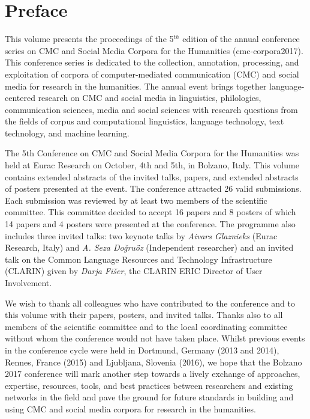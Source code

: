 \documentclass[usegeometry]{scrbook}
\begin{document}
\vfill

\noindent\colophon

\smallskip

\doclicenseThis
\thispagestyle{empty}
\clearpage


\chapter*{Preface}
{}
This volume presents the proceedings of the 5{$^{th}$} edition of the annual conference series on CMC and Social Media Corpora for the Humanities (cmc-corpora2017). This conference series is dedicated to the collection, annotation, processing, and exploitation of corpora of computer-mediated communication (CMC) and social media for research in the humanities. The annual event brings together language-centered research on CMC and social media in linguistics, philologies, communication sciences, media and social sciences with research questions from the fields of corpus and computational linguistics, language technology, text technology, and machine learning.

The 5th Conference on CMC and Social Media Corpora for the Humanities was held at Eurac Research on October, 4th and 5th, in Bolzano, Italy. This volume contains extended abstracts of the invited talks, papers, and extended abstracts of posters presented at the event. The conference attracted 26 valid submissions. Each submission was reviewed by at least two members of the scientific committee. This committee decided to accept 16 papers and 8 posters of which 14 papers and 4 posters were presented at the conference. The programme also includes three invited talks: two keynote talks by \textit{Aivars Glaznieks} (Eurac Research, Italy) and \textit{A. Seza Do\u{g}ru\"oz} (Independent researcher) and an invited talk on the Common Language Resources and Technology Infrastructure (CLARIN) given by \textit{Darja Fi\v{s}er}, the CLARIN ERIC Director of User Involvement.

We wish to thank all colleagues who have contributed to the conference and to this volume with their papers, posters, and invited talks. Thanks also to all members of the scientific committee and to the local coordinating committee without whom the conference would not have taken place. Whilst previous events in the conference cycle were held in Dortmund, Germany (2013 and 2014), Rennes, France (2015) and Ljubljana, Slovenia (2016), we hope that the Bolzano 2017 conference will mark another step towards a lively exchange of approaches, expertise, resources, tools, and best practices between researchers and existing networks in the field and pave the ground for future standards in building and using CMC and social media corpora for research in the humanities.
\end{document}
